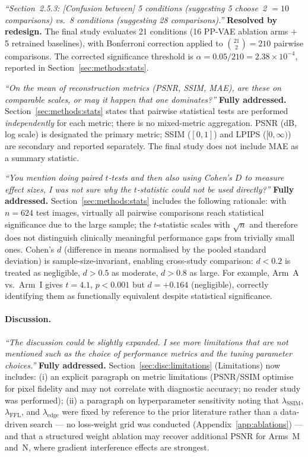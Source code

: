 \documentclass[12pt, a4paper, twoside, openright]{book}
\begin{document}
\begin{appendices}
\textit{``Section~2.5.3: [Confusion between] 5 conditions (suggesting 5 choose~2 $= 10$ comparisons) vs.\ 8 conditions (suggesting 28 comparisons).''}
\textbf{Resolved by redesign.} The final study evaluates 21 conditions (16 PP-VAE ablation arms $+$ 5 retrained baselines), with Bonferroni correction applied to $\binom{21}{2} = 210$ pairwise comparisons. The corrected significance threshold is $\alpha = 0.05/210 = 2.38 \times 10^{-4}$, reported in Section~\ref{sec:methods:stats}.

\textit{``On the mean of reconstruction metrics (PSNR, SSIM, MAE), are these on comparable scales, or may it happen that one dominates?''}
\textbf{Fully addressed.} Section~\ref{sec:methods:stats} states that pairwise statistical tests are performed \emph{independently} for each metric; there is no mixed-metric aggregation. PSNR (dB, log scale) is designated the primary metric; SSIM ($[0,1]$) and LPIPS ($[0,\infty)$) are secondary and reported separately. The final study does not include MAE as a summary statistic.

\textit{``You mention doing paired $t$-tests and then also using Cohen's $D$ to measure effect sizes, I was not sure why the $t$-statistic could not be used directly?''}
\textbf{Fully addressed.} Section~\ref{sec:methods:stats} includes the following rationale: with $n = 624$ test images, virtually all pairwise comparisons reach statistical significance due to the large sample; the $t$-statistic scales with $\sqrt{n}$ and therefore does not distinguish clinically meaningful performance gaps from trivially small ones. Cohen's $d$ (difference in means normalised by the pooled standard deviation) is sample-size-invariant, enabling cross-study comparison: $d < 0.2$ is treated as negligible, $d > 0.5$ as moderate, $d > 0.8$ as large. For example, Arm~A vs.\ Arm~I gives $t = 4.1$, $p < 0.001$ but $d = +0.164$ (negligible), correctly identifying them as functionally equivalent despite statistical significance.

\paragraph{Discussion.}
\textit{``The discussion could be slightly expanded. I see more limitations that are not mentioned such as the choice of performance metrics and the tuning parameter choices.''}
\textbf{Fully addressed.} Section~\ref{sec:disc:limitations} (Limitations) now includes: (i) an explicit paragraph on metric limitations (PSNR/SSIM optimise for pixel fidelity and may not correlate with diagnostic accuracy; no reader study was performed); (ii) a paragraph on hyperparameter sensitivity noting that $\lambda_{\mathrm{SSIM}}$, $\lambda_{\mathrm{FFL}}$, and $\lambda_{\mathrm{edge}}$ were fixed by reference to the prior literature rather than a data-driven search --- no loss-weight grid was conducted (Appendix~\ref{app:ablations}) --- and that a structured weight ablation may recover additional PSNR for Arms~M and~N, where gradient interference effects are strongest.


\end{appendices}
\end{document}
